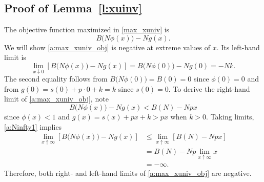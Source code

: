 \documentclass[12pt]{article}
\newcommand{\efficacy}{\phi}
\newcommand{\benefit}{B}
\begin{document}

\subsection*{Proof of Lemma~\ref{l:xuinv}}

The objective function maximized in \eqref{max_xuniv} is
\begin{equation}
\label{a:max_xuniv_obj}
\benefit \bigl( N\efficacy(x) \bigr) - N g(x).
\end{equation}
We will show \eqref{a:max_xuniv_obj} is negative at extreme values of
$x$. Its left-hand limit is
\begin{equation}
 \label{a:N0limit}
\lim_{x \downarrow 0} \left[ \benefit \bigl( N\efficacy(x) \bigr) - N
  g(x) \right] = \benefit \bigl( N\efficacy(0) \bigr) - N g(0) = -Nk.
\end{equation}
The second equality follows from $\benefit \bigl( N \efficacy(0)
\bigr) = \benefit(0) = 0$ since $\efficacy(0) = 0$ and from $g(0) =
s(0) + p \cdot 0 + k = k$ since $s(0) = 0$. To derive the right-hand
limit of \eqref{a:max_xuniv_obj}, note
\begin{equation}
\label{a:Ninfty1}
\benefit \bigl( N \efficacy(x) \bigr) - N g(x) < \benefit(N) - Npx
\end{equation}
since $\efficacy(x) < 1$ and $g(x) = s(x) + px + k > px$ when $k >
0$. Taking limits, \eqref{a:Ninfty1} implies
\begin{align}
\lim_{x \uparrow \infty} \left[ \benefit \bigl( N\efficacy(x) \bigr) - N g(x) \right] & \leq \lim_{x \uparrow \infty} \left[ \benefit(N) - Npx \right] \label{a:Ninfty2} \\
& = \benefit(N) - Np \lim_{x \uparrow \infty} x \label{a:Ninfty3} \\
& = - \infty. \label{a:Ninfty4}
\end{align}
Therefore, both right- and left-hand limits of \eqref{a:max_xuniv_obj}
are negative.
\end{document}
